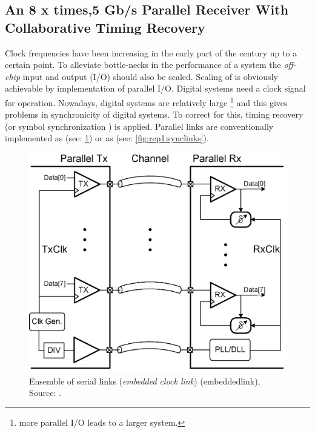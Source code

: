 
\subsection{An 8 x times,5 Gb/s Parallel Receiver With Collaborative Timing Recovery \cite{agrawal20098}}  \label{ss:agrawal20098}

Clock frequencies have been increasing in the early part of the century up to a certain point.
To alleviate bottle-necks in the performance of a system the \textit{off-chip} input and output (I/O) should also be scaled.
Scaling of  is obviously achievable by implementation of parallel I/O.
Digital systems need a clock signal for operation.
Nowadays, digital systems are relatively large \footnote{more parallel I/O leads to a larger system.} and this gives problems in synchronicity of digital systems.
To correct for this, timing recovery (or symbol synchronization \cite{mueller1976timing}) is applied.
Parallel links are conventionally implemented as  (see: \cref{fig:rep1:seriallinks}) or as   (see: \cref{fig:rep1:synclinks}).

\begin{figure}	\centering
	
	\includegraphics[width=0.8\linewidth]{Figures/Rep1SourceSync.png}
	\caption{Ensemble of serial links (\textit{embedded clock link}) (\ac{embeddedlink}), Source: \cite{agrawal20098}.} 
    \label{fig:rep1:seriallinks}
\end{figure}

